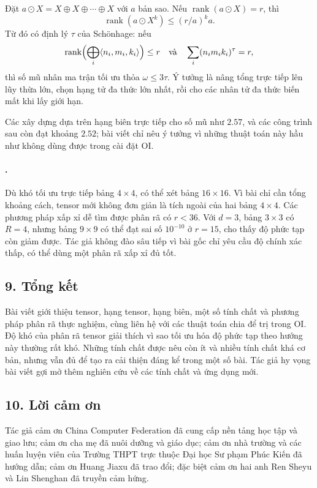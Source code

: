 \documentclass[11pt]{article}
\begin{document}
Đặt \(a\odot X=X\oplus X\oplus\cdots\oplus X\) với \(a\) bản sao. Nếu
\(\operatorname{rank}(a\odot X)=r\), thì
\[
  \operatorname{rank}(a\odot X^k)\le (r/a)^k a.
\]
Từ đó có định lý \(\tau\) của Schönhage: nếu
\[
  \operatorname{rank}\Bigl(\bigoplus_i \langle n_i,m_i,k_i\rangle\Bigr)\le r
  \quad\text{và}\quad
  \sum_i(n_i m_i k_i)^\tau=r,
\]
thì số mũ nhân ma trận tối ưu thỏa \(\omega\le 3\tau\). Ý tưởng là nâng tổng
trực tiếp lên lũy thừa lớn, chọn hạng tử đa thức lớn nhất, rồi cho các nhân tử
đa thức biến mất khi lấy giới hạn.

Các xây dựng dựa trên hạng biên trực tiếp cho số mũ như \(2.57\), và các công
trình sau còn đạt khoảng \(2.52\); bài viết chỉ nêu ý tưởng vì những thuật toán
này hầu như không dùng được trong cài đặt OI.

\paragraph{.}
Dù khó tối ưu trực tiếp bảng \(4\times 4\), có thể xét bảng \(16\times 16\).
Vì bài chỉ cần tổng khoảng cách, tensor mới không đơn giản là tích ngoài của
hai bảng \(4\times 4\). Các phương pháp xấp xỉ dễ tìm được phân rã có
\(r<36\). Với \(d=3\), bảng \(3\times 3\) có \(R=4\), nhưng bảng \(9\times 9\)
có thể đạt sai số \(10^{-10}\) ở \(r=15\), cho thấy độ phức tạp còn giảm được.
Tác giả không đào sâu tiếp vì bài gốc chỉ yêu cầu độ chính xác thấp, có thể
dùng một phân rã xấp xỉ đủ tốt.

\subsection*{9. Tổng kết}

Bài viết giới thiệu tensor, hạng tensor, hạng biên, một số tính chất và phương
pháp phân rã thực nghiệm, cùng liên hệ với các thuật toán chia để trị trong
OI. Độ khó của phân rã tensor giải thích vì sao tối ưu hóa độ phức tạp theo
hướng này thường rất khó. Những tính chất được nêu còn ít và nhiều tính chất
khá cơ bản, nhưng vẫn đủ để tạo ra cải thiện đáng kể trong một số bài. Tác giả
hy vọng bài viết gợi mở thêm nghiên cứu về các tính chất và ứng dụng mới.

\subsection*{10. Lời cảm ơn}

Tác giả cảm ơn China Computer Federation đã cung cấp nền tảng học tập và giao
lưu; cảm ơn cha mẹ đã nuôi dưỡng và giáo dục; cảm ơn nhà trường và các huấn
luyện viên của Trường THPT trực thuộc Đại học Sư phạm Phúc Kiến đã hướng dẫn;
cảm ơn Huang Jiaxu đã trao đổi; đặc biệt cảm ơn hai anh Ren Sheyu và Lin
Shenghan đã truyền cảm hứng.
\end{document}
